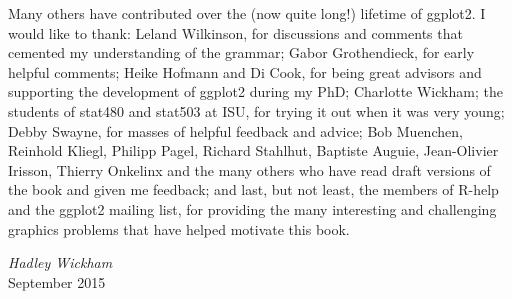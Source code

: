 Many others have contributed over the (now quite long!) lifetime of
ggplot2. I would like to thank: Leland Wilkinson, for discussions and
comments that cemented my understanding of the grammar; Gabor
Grothendieck, for early helpful comments; Heike Hofmann and Di Cook, for
being great advisors and supporting the development of ggplot2 during my
PhD; Charlotte Wickham; the students of stat480 and stat503 at ISU, for
trying it out when it was very young; Debby Swayne, for masses of
helpful feedback and advice; Bob Muenchen, Reinhold Kliegl, Philipp
Pagel, Richard Stahlhut, Baptiste Auguie, Jean-Olivier Irisson, Thierry
Onkelinx and the many others who have read draft versions of the book
and given me feedback; and last, but not least, the members of R-help
and the ggplot2 mailing list, for providing the many interesting and
challenging graphics problems that have helped motivate this book.

\vspace{\baselineskip}
\begin{flushright}\noindent
{\it Hadley Wickham}\\
September 2015\\
\end{flushright}
